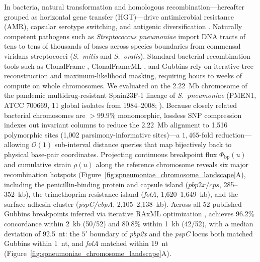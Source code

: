 In bacteria, natural transformation and homologous recombination—hereafter grouped as horizontal gene transfer (HGT)—drive antimicrobial resistance (AMR), capsular serotype switching, and antigenic diversification \citep{didelot2010impact,croucher2011rapid}. Naturally competent pathogens such as \textit{Streptococcus pneumoniae} import DNA tracts of tens to tens of thousands of bases across species boundaries from commensal viridans streptococci (\textit{S.~mitis} and \textit{S.~oralis}). Standard bacterial recombination tools such as ClonalFrame \citep{didelot2007inference}, ClonalFrameML \citep{didelot2015clonalframeml}, and Gubbins \citep{croucher2015rapid} rely on iterative tree reconstruction and maximum-likelihood masking, requiring hours to weeks of compute on whole chromosomes. We evaluated \RhizAeon on the 2.22~Mb chromosome of the pandemic multidrug-resistant Spain23F-1 lineage of \textit{S.~pneumoniae} (PMEN1, ATCC 700669, 11 global isolates from 1984--2008; \citealt{croucher2011rapid}). Because closely related bacterial chromosomes are $>99.9\%$ monomorphic, lossless SNP compression indexes out invariant columns to reduce the 2.22~Mb alignment to 1,516 polymorphic sites (1,002 parsimony-informative sites)—a $1{,}465$-fold reduction—allowing $\mathcal{O}(1)$ sub-interval distance queries that map bijectively back to physical base-pair coordinates. Projecting continuous breakpoint flux $\Phi_{\mathrm{bp}}(u)$ and cumulative strain $\rho(u)$ along the reference chromosome reveals six major recombination hotspots (Figure~\ref{fig:spneumoniae_chromosome_landscape}A), including the penicillin-binding protein and capsule island ($pbp2x/cps$, 285--352~kb), the trimethoprim resistance island (\textit{folA}, 1,620--1,649~kb), and the surface adhesin cluster (\textit{pspC/cbpA}, 2,105--2,138~kb). Across all 52 published Gubbins breakpoints inferred via iterative RAxML optimization \citep{croucher2011rapid,croucher2015rapid}, \RhizAeon achieves 96.2\% concordance within 2~kb (50/52) and 80.8\% within 1~kb (42/52), with a median deviation of 92.5~nt: the $5'$ boundary of \textit{pbp2x} and the \textit{pspC} locus both matched Gubbins within 1~nt, and \textit{folA} matched within 19~nt (Figure~\ref{fig:spneumoniae_chromosome_landscape}A).

